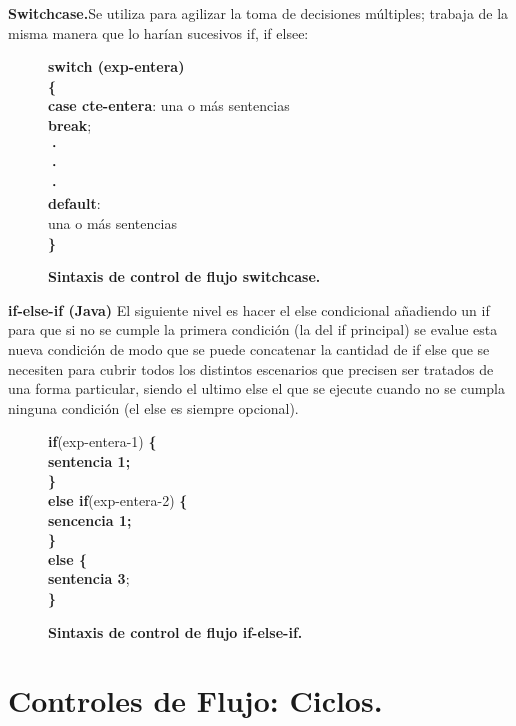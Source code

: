 \documentclass[a4paper]{article}
\begin{document}
\textbf{Switchcase.}Se utiliza para agilizar la toma de decisiones múltiples; trabaja de la misma manera que lo harían sucesivos if, if elsee: \\
\begin{figure}[H]
	 \centering
\textbf{switch (exp-entera)}\\
\textbf{\{}\\ 
\textbf{case cte-entera}: una o más sentencias \\ 
\textbf{break};\\
\textbf{·} \\ 
\textbf{·} \\ 
\textbf{·} \\ 
\textbf{default}:\\
	una o más sentencias\\
\textbf{\}}\\
        \caption{\textbf{Sintaxis de control de flujo switchcase.}}
\end{figure}

\textbf{if-else-if (Java)} El siguiente nivel es hacer el else condicional añadiendo un if para que si no se cumple la primera condición (la del if principal) se evalue esta nueva condición de modo que se puede concatenar la cantidad de if else que se necesiten para cubrir todos los distintos escenarios que precisen ser tratados de una forma particular, siendo el ultimo else el que se ejecute cuando no se cumpla ninguna condición (el else es siempre opcional).\\

\begin{figure}[H]
\centering
        \textbf{if}(exp-entera-1) \textbf{ \{ }\\
        \textbf{sentencia 1;}\\
	\textbf{ \} } \\
        \textbf{else if}(exp-entera-2)
        \textbf{ \{ }\\
        \textbf{sencencia 1;}\\
        \textbf{\}}\\ 
        \textbf{else \{ }\\
	\textbf{sentencia 3};\\
	\textbf{\}}
        \caption{\textbf{Sintaxis de control de flujo if-else-if.}}
\end{figure} 
\pagebreak

\section{Controles de Flujo: Ciclos.}
\end{document}
